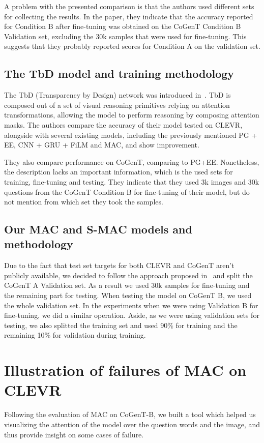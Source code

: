 A problem with the presented comparison is that the authors used different sets for collecting the results. In the paper, they indicate that the accuracy reported for Condition B after fine-tuning was obtained on the CoGenT Condition B Validation set, excluding the 30k samples that were used for fine-tuning.
This suggests that they probably reported scores for Condition A on the validation set.


\subsection{The TbD model and training methodology}

The TbD (Transparency by Design) network was introduced in~\cite{mascharka2018transparency}.
TbD is composed out of a set of visual reasoning primitives relying on attention transformations, allowing the model to perform reasoning by composing  attention masks.
The authors compare the accuracy of their model tested on CLEVR, alongside with several existing models, including the previously mentioned PG + EE, CNN + GRU + FiLM and MAC, and show improvement.

They also compare performance on CoGenT, comparing to PG+EE.
Nonetheless, the description lacks an important information, which is the used sets for training, fine-tuning and testing. 
They indicate that they used 3k images and 30k questions from the CoGenT Condition B for fine-tuning of their model, but do not mention from which set they took the samples.


\subsection{Our MAC and S-MAC models and methodology}

Due to the fact that test set targets for both CLEVR and CoGenT aren't publicly available, we decided to follow the approach proposed in~\cite{perez2017film} and split the CoGenT A Validation set.
As a result we used 30k samples for fine-tuning and the remaining part for testing.
When testing the model on CoGenT B, we used the whole validation set.
In the experiments when we were using Validation B for fine-tuning, we did a similar operation.
Aside, as we were using validation sets for testing, we also splitted the training set and used 90\% for training and the remaining 10\% for validation during training.

\newpage
\section{Illustration of failures of MAC on CLEVR}
Following the evaluation of MAC on CoGenT-B, we built a tool which helped us visualizing the attention of the model over the question words and the image, and thus provide insight on some cases of failure.

